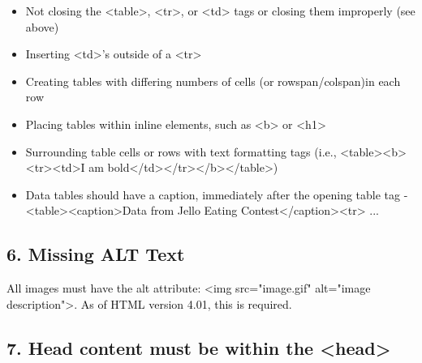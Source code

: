 \documentclass[12pt]{report}
\renewcommand{\_}{\kern-1.5pt\textunderscore\kern-1.5pt}
\begin{document}
\setlength{\parskip}{5.04pt}
\begin{itemize}
	\item \textcolor[HTML]{0D0D0D}{Not closing the <table>, <tr>, or <td> tags or closing them improperly (see above)}\par

	\item \textcolor[HTML]{0D0D0D}{Inserting <td>'s outside of a <tr>}\par

	\item \textcolor[HTML]{0D0D0D}{Creating tables with differing numbers of cells (or rowspan/colspan)in each row}\par

	\item \textcolor[HTML]{0D0D0D}{Placing tables within inline elements, such as <b> or <h1>}\par

	\item \textcolor[HTML]{0D0D0D}{Surrounding table cells or rows with text formatting tags (i.e., <table><b><tr><td>I am bold</td></tr></b></table>)}\par

	\item \textcolor[HTML]{0D0D0D}{Data tables should have a caption, immediately after the opening table tag - <table><caption>Data from Jello Eating Contest</caption><tr> ...}
\end{itemize}\par

\setlength{\parskip}{9.0pt}
\begin{adjustwidth}{0.2in}{0.84in}
\subsection*{6. Missing ALT Text}
\end{adjustwidth}

\begin{adjustwidth}{0.2in}{0.84in}
\textcolor[HTML]{0D0D0D}{All images must have the alt attribute: <img src="image.gif" alt="image description">. As of HTML version 4.01, this is required.}\par

\end{adjustwidth}

\begin{adjustwidth}{0.2in}{0.84in}
\subsection*{7. Head content must be within the <head>}
\end{adjustwidth}
\end{document}
